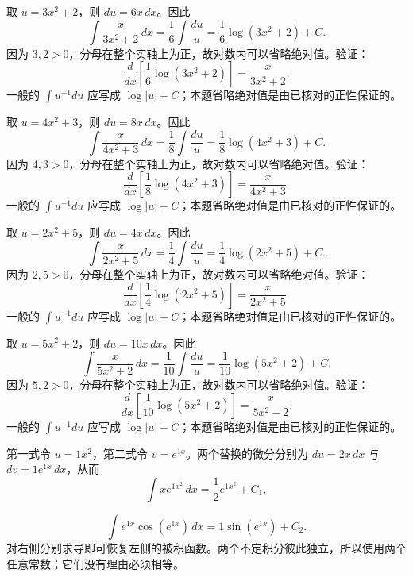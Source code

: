 \documentclass[12pt,fontset=fandol]{ctexart}
\begin{document}
\begin{solve}\label{ans:c12q9}
取 $u=3x^2+2$，则 $du=6x\,dx$。因此
\[
\int\frac{x}{3x^2+2}\,dx=\frac{1}{6}\int\frac{du}u=\frac{1}{6}\log(3x^2+2)+C.
\]
因为 $3,2>0$，分母在整个实轴上为正，故对数内可以省略绝对值。验证：
\[
\frac d{dx}\left[\frac{1}{6}\log(3x^2+2)\right]=\frac{x}{3x^2+2}.
\]
一般的 $\int u^{-1}du$ 应写成 $\log|u|+C$；本题省略绝对值是由已核对的正性保证的。
\end{solve}

\begin{solve}\label{ans:c12q10}
取 $u=4x^2+3$，则 $du=8x\,dx$。因此
\[
\int\frac{x}{4x^2+3}\,dx=\frac{1}{8}\int\frac{du}u=\frac{1}{8}\log(4x^2+3)+C.
\]
因为 $4,3>0$，分母在整个实轴上为正，故对数内可以省略绝对值。验证：
\[
\frac d{dx}\left[\frac{1}{8}\log(4x^2+3)\right]=\frac{x}{4x^2+3}.
\]
一般的 $\int u^{-1}du$ 应写成 $\log|u|+C$；本题省略绝对值是由已核对的正性保证的。
\end{solve}

\begin{solve}\label{ans:c12q11}
取 $u=2x^2+5$，则 $du=4x\,dx$。因此
\[
\int\frac{x}{2x^2+5}\,dx=\frac{1}{4}\int\frac{du}u=\frac{1}{4}\log(2x^2+5)+C.
\]
因为 $2,5>0$，分母在整个实轴上为正，故对数内可以省略绝对值。验证：
\[
\frac d{dx}\left[\frac{1}{4}\log(2x^2+5)\right]=\frac{x}{2x^2+5}.
\]
一般的 $\int u^{-1}du$ 应写成 $\log|u|+C$；本题省略绝对值是由已核对的正性保证的。
\end{solve}

\begin{solve}\label{ans:c12q12}
取 $u=5x^2+2$，则 $du=10x\,dx$。因此
\[
\int\frac{x}{5x^2+2}\,dx=\frac{1}{10}\int\frac{du}u=\frac{1}{10}\log(5x^2+2)+C.
\]
因为 $5,2>0$，分母在整个实轴上为正，故对数内可以省略绝对值。验证：
\[
\frac d{dx}\left[\frac{1}{10}\log(5x^2+2)\right]=\frac{x}{5x^2+2}.
\]
一般的 $\int u^{-1}du$ 应写成 $\log|u|+C$；本题省略绝对值是由已核对的正性保证的。
\end{solve}

\begin{solve}\label{ans:c12q13}
第一式令 $u=1x^2$，第二式令 $v=e^{1x}$。两个替换的微分分别为 $du=2x\,dx$ 与 $dv=1e^{1x}\,dx$，从而
\[
\int xe^{1x^2}\,dx=\frac{1}{2}e^{1x^2}+C_1,
\]

\[
\int e^{1x}\cos(e^{1x})\,dx=1\sin(e^{1x})+C_2.
\]
对右侧分别求导即可恢复左侧的被积函数。两个不定积分彼此独立，所以使用两个任意常数；它们没有理由必须相等。
\end{solve}
\end{document}
